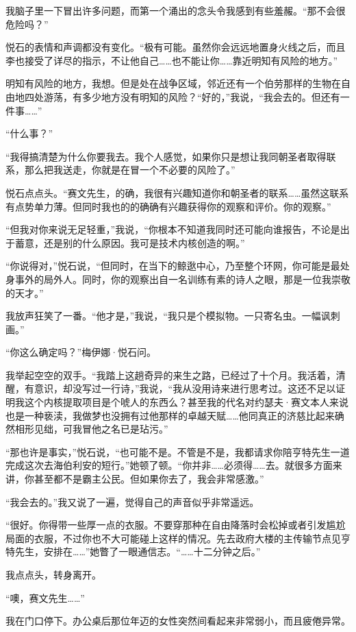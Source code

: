 \documentclass[AutoFakeBold=true]{book}
\begin{document}
我脑子里一下冒出许多问题，而第一个涌出的念头令我感到有些羞赧。``那不会很危险吗？''

悦石的表情和声调都没有变化。``极有可能。虽然你会远远地置身火线之后，而且李也接受了详尽的指示，不让他自己……也不能让你……靠近明知有风险的地方。''

{\kaishu 明知有风险的地方}，我想。但是处在战争区域，邻近还有一个伯劳那样的生物在自由地四处游荡，有多少地方没有明知的风险？``好的，''我说，``我会去的。但还有一件事……''

``什么事？''

``我得搞清楚为什么你要我去。我个人感觉，如果你只是想让我同朝圣者取得联系，那么把我送走，你就是在冒一个不必要的风险了。''

悦石点点头。``赛文先生，的确，我很有兴趣知道你和朝圣者的联系……虽然这联系有点势单力薄。但同时我也的的确确有兴趣获得你的观察和评价。{\kaishu 你的}观察。''

``但我对你来说无足轻重，''我说，``你根本不知道我同时还可能向谁报告，不论是出于蓄意，还是别的什么原因。我可是技术内核创造的啊。''

``你说得对，''悦石说，``但同时，在当下的鲸逖中心，乃至整个环网，你可能是最处身事外的局外人。同时，你的观察出自一名训练有素的诗人之眼，那是一位我崇敬的天才。''

我放声狂笑了一番。``他才是，''我说，``我只是个模拟物。一只寄名虫。一幅讽刺画。''

``你这么确定吗？''梅伊娜·悦石问。

我举起空空的双手。``我踏上这趟奇异的来生之路，已经过了十个月。我活着，清醒，有意识，却没写过一行诗，''我说，``我从没用诗来进行思考过。这还不足以证明我这个内核提取项目是个唬人的东西么？甚至我的代名对约瑟夫·赛文本人来说也是一种亵渎，我做梦也没拥有过他那样的卓越天赋……他同真正的济慈比起来确然相形见绌，可我冒他之名已是玷污。''

``那也许是事实，''悦石说，``也可能不是。不管是不是，我都请求你陪亨特先生一道完成这次去海伯利安的短行。''她顿了顿。``你并非……必须得……去。就很多方面来讲，你甚至都不是霸主公民。但如果你去了，我会非常感激。''

``我会去的。''我又说了一遍，觉得自己的声音似乎非常遥远。

``很好。你得带一些厚一点的衣服。不要穿那种在自由降落时会松掉或者引发尴尬局面的衣服，不过你也不大可能碰上这样的情况。先去政府大楼的主传输节点见亨特先生，安排在……''她瞥了一眼通信志。``……十二分钟之后。''

我点点头，转身离开。

``噢，赛文先生……''

我在门口停下。办公桌后那位年迈的女性突然间看起来非常弱小，而且疲倦异常。
\end{document}
